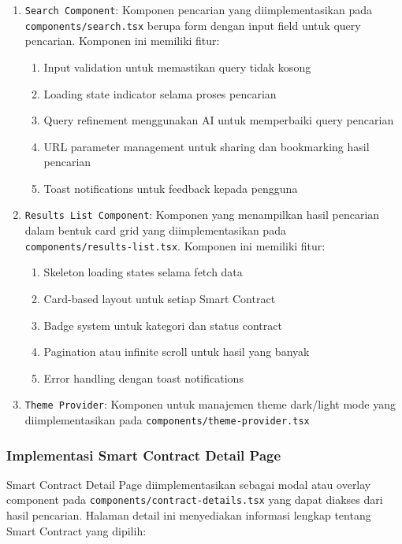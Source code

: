 \begin{enumerate}
	\item \texttt{Search Component}: Komponen pencarian yang diimplementasikan pada \texttt{components/search.tsx} berupa form dengan input field untuk query pencarian. Komponen ini memiliki fitur:
	      \begin{enumerate}
		      \item Input validation untuk memastikan query tidak kosong
		      \item Loading state indicator selama proses pencarian
		      \item Query refinement menggunakan AI untuk memperbaiki query pencarian
		      \item URL parameter management untuk sharing dan bookmarking hasil pencarian
		      \item Toast notifications untuk feedback kepada pengguna
	      \end{enumerate}
	\item \texttt{Results List Component}: Komponen yang menampilkan hasil pencarian dalam bentuk card grid yang diimplementasikan pada \\\texttt{components/results-list.tsx}. Komponen ini memiliki fitur:
	      \begin{enumerate}
		      \item Skeleton loading states selama fetch data
		      \item Card-based layout untuk setiap Smart Contract
		      \item Badge system untuk kategori dan status contract
		      \item Pagination atau infinite scroll untuk hasil yang banyak
		      \item Error handling dengan toast notifications
	      \end{enumerate}
	\item \texttt{Theme Provider}: Komponen untuk manajemen theme dark/light mode yang diimplementasikan pada \texttt{components/theme-provider.tsx}
\end{enumerate}

\subsubsection{Implementasi Smart Contract Detail Page}

Smart Contract Detail Page diimplementasikan sebagai modal atau overlay component pada \texttt{components/contract-details.tsx} yang dapat diakses dari hasil pencarian. Halaman detail ini menyediakan informasi lengkap tentang Smart Contract yang dipilih:

